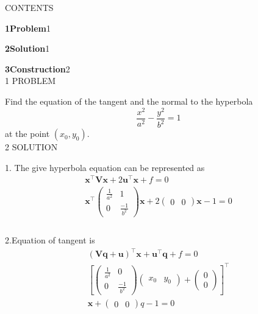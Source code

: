 \documentclass[a4paper,10pt]{report}
\newcommand{\myvec}[1]{\ensuremath{\begin{pmatrix}#1\end{pmatrix}}}
\let\vec\mathbf
\providecommand{\sbrak}[1]{\ensuremath{{}\left[#1\right]}}
\begin{document}
\begin{multicols}{2}
\centering \large\textsc{C}\footnotesize\textsc{ONTENTS}\vspace{5mm}\\
\raggedright\large\textbf{1\hspace{1cm}Problem}\hspace{5.2cm}1\vspace{5mm}\\
\raggedright\large\textbf{2\hspace{1cm}Solution}\hspace{5.25cm}1\vspace{5mm}\\
\raggedright\large\textbf{3\hspace{1cm}Construction}\hspace{4.25cm}2\vspace{5mm}\\
\centering \large\textsc{1  P}\footnotesize\textsc{ROBLEM}\vspace{5mm}\\
	\raggedright\large{Find the equation of the tangent and the normal to the hyperbola} $$ \frac{x^{2}}{a^{2}} - \frac{y^{2}}{b^{2}} = 1 $$ at the point $(x_0,y_0)$.\vspace{5mm}\\
\centering \large\textsc{2  S}\footnotesize\textsc{OLUTION}\vspace{5mm}\\
\raggedright\large{1. The give hyperbola equation can be represented as  }
\begin{gather*}
\vec{x}^{\top}\vec{V}\vec{x} + 2\vec{u}^{\top}\vec{x}+f = 0 \\
\vec{x}^{\top}\myvec{\frac{1}{a^{2}} & 1 \\ 0 & \frac{-1}{b^{2}}}\vec{x} + 2\myvec{0&0}\vec{x} -1 = 0 \\
\end{gather*} \vspace{2mm}\\
2.Equation of tangent is
\begin{gather*}
\vec{(Vq+u)}^{\top}\vec{x} + \vec{u}^{\top}\vec{q} + f =0\\
\sbrak{\myvec{\frac{1}{a^{2}}& 0 \\ 0  & \frac{-1}{b^{2}}}\myvec{x_0 & y_0} + \myvec{0 \\ 0}}^{\top}\\\vec{x} + \myvec{0 & 0}q - 1 = 0\\
\end{gather*}
\begin{align}

\end{align}
\end{multicols}
\end{document}
